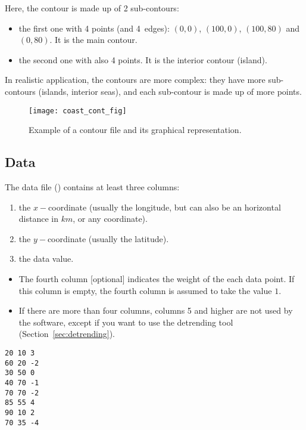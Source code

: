 Here, the contour is made up of 2 sub-contours: 
\begin{itemize}
\item the first one with 4 points (and 4~edges): $(0,0)$, $(100,0)$, $(100,80)$ and $(0,80)$. It is the main contour.
\item the second one with also 4 points. It is the interior contour (island).
\end{itemize}
In realistic application, the contours are more complex: they have more sub-contours (islands, interior seas), and each sub-contour is made up of more points. 

\begin{figure}[H]
\centering 
\texttt{[image: coast\_cont\_fig]}
\caption{Example of a contour file and its graphical representation.}
\end{figure}

\subsection{Data\label{sec:dataformat}}

The data file () contains at least three columns: 
\begin{enumerate}
\item the $x-$coordinate (usually the longitude, but can also be an horizontal distance in $km$, or any coordinate).
\item the $y-$coordinate (usually the latitude).
\item the data value.
\end{enumerate}
\begin{itemize}
\item The fourth column [optional] indicates the weight of the each data point. If this column is empty, the fourth column is assumed to take the value $1$. 
\item If there are more than four columns, columns 5 and higher are not used by the software, except if you want to use the detrending tool (Section~\ref{sec:detrending}). 
\end{itemize}

\begin{exfile}[htpb]
\begin{footnotesize}
\texttt{20 10 3\\
60 20 -2\\
30 50 0\\
40 70 -1\\
70 70 -2\\
85 55 4\\
90 10 2\\
70 35 -4} 
\end{footnotesize}
\caption{data.dat\label{ex:data.dat}}
\end{exfile}


